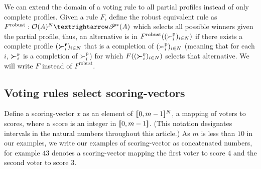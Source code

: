 \documentclass[version=last, pagesize, twoside=off, bibliography=totoc, DIV=calc, fontsize=14pt, a4paper, french, english]{scrartcl}
\begin{document}
We can extend the domain of a voting rule to all partial profiles instead of only complete profiles. Given a rule $F$, define the robust equivalent rule as $F^\text{robust}: \allpprofs → \powersetz{\alts}$ which selects all possible winners given the partial profile, thus, an alternative is in $F^\text{robust}((\succ_i^\text{p})_{i \in N})$ if there exists a complete profile $(\boldsymbol{\succ}^\textbf{r}_i)_{i \in N}$ that is a completion of $(\succ_i^\text{p})_{i \in N}$ (meaning that for each $i$, $\boldsymbol{\succ}^\textbf{r}_i$ is a completion of $\succ^\text{p}_i$) for which $F((\boldsymbol{\succ}^\textbf{r}_i)_{i \in N})$ selects that alternative. We will write $F$ instead of $F^\text{robust}$.

\subsection{Voting rules select scoring-vectors}
Define a scoring-vector $x$ as an element of $\lbrack\!\lbrack{}0, m-1\rbrack\!\rbrack^N$, a mapping of voters to scores, where a score is an integer in $\lbrack\!\lbrack{}0, m-1\rbrack\!\rbrack$. (This notation designates intervals in the natural numbers throughout this article.) As $m$ is less than $10$ in our examples, we write our examples of scoring-vector as concatenated numbers, for example $43$ denotes a scoring-vector mapping the first voter to score $4$ and the second voter to score $3$.
\end{document}
